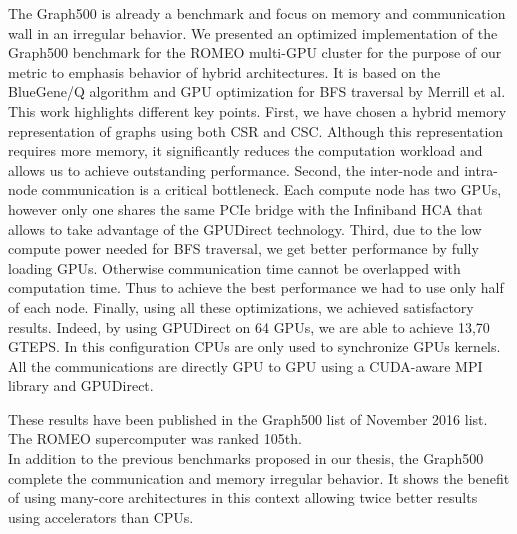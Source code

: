 The Graph500 is already a benchmark and focus on memory and communication wall in an irregular behavior.
We presented an optimized implementation of the Graph500 benchmark for the ROMEO  multi-GPU cluster for the purpose of our metric to emphasis behavior of hybrid architectures.
It is based on the BlueGene/Q algorithm and GPU optimization for BFS traversal by Merrill et al. 
This work highlights different key points.
First, we have chosen a hybrid memory representation of graphs using both CSR and CSC. %
Although this representation requires more memory, it significantly reduces  the computation workload and allows us to achieve outstanding performance.
Second, the inter-node and intra-node communication is a critical bottleneck. 
Each compute node has two GPUs, however only one shares the same PCIe bridge with the Infiniband HCA that allows to take advantage of the GPUDirect technology.
Third, due to the low compute power needed for BFS traversal, we get better performance by fully loading GPUs.
Otherwise communication time cannot be overlapped with computation time. 
Thus to achieve the best performance we had to use only half of each node.
Finally, using all these optimizations, we achieved satisfactory results. 
Indeed, by using GPUDirect on 64 GPUs,  we are able to achieve 13,70 GTEPS. 
In this configuration CPUs are only used to synchronize GPUs kernels. 
All the communications are directly GPU to GPU using a CUDA-aware MPI library and GPUDirect.

These results have been published in the Graph500 list of November 2016 list. 
The ROMEO supercomputer was ranked 105th.\\ 

In addition to the previous benchmarks proposed in our thesis, the Graph500 complete the communication and memory irregular behavior. 
It shows the benefit of using many-core architectures in this context allowing twice better results using accelerators than CPUs.
 
